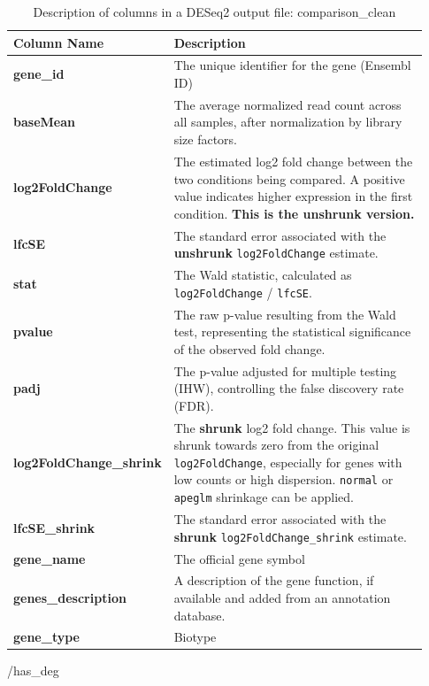 \documentclass{article}
\begin{document}
\begin{table}[h!]
  \centering
  \small %
  \caption{Description of columns in a DESeq2 output file: {{comparison_clean}} }
  \label{tab:deseq2_output}
  \begin{tabular}{|p{0.25\linewidth}|p{0.68\linewidth}|}
  \toprule
  \textbf{Column Name} & \textbf{Description} \\
  \midrule
  \textbf{gene\_id} & The unique identifier for the gene (Ensembl ID) \\
  \textbf{baseMean} & The average normalized read count across all samples, after normalization by library size factors. \\
  \textbf{log2FoldChange} & The estimated log2 fold change between the two conditions being compared. A positive value indicates higher expression in the first condition. \textbf{This is the unshrunk version.} \\
  \textbf{lfcSE} & The standard error associated with the \textbf{unshrunk} \texttt{log2FoldChange} estimate. \\
  \textbf{stat} & The Wald statistic, calculated as \texttt{log2FoldChange} / \texttt{lfcSE}. \\
  \textbf{pvalue} & The raw p-value resulting from the Wald test, representing the statistical significance of the observed fold change. \\
  \textbf{padj} & The p-value adjusted for multiple testing (IHW), controlling the false discovery rate (FDR). \\
  \textbf{log2FoldChange\_shrink} & The \textbf{shrunk} log2 fold change. This value is shrunk towards zero from the original \texttt{log2FoldChange}, especially for genes with low counts or high dispersion. \texttt{normal} or \texttt{apeglm} shrinkage can be applied. \\
  \textbf{lfcSE\_shrink} & The standard error associated with the \textbf{shrunk} \texttt{log2FoldChange\_shrink} estimate. \\
  \textbf{gene\_name} & The official gene symbol \\
  \textbf{genes\_description} & A description of the gene function, if available and added from an annotation database. \\
  \textbf{gene\_type} & Biotype \\
  \bottomrule
  \end{tabular}
\end{table}

{{/has_deg}}
\end{document}
